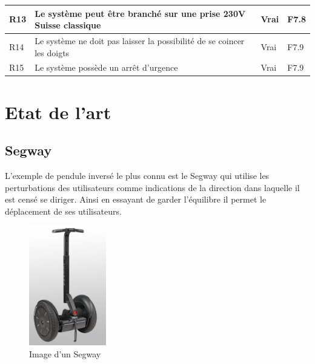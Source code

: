 \begin{table}[H]
{\begin{tabular}{|l|l|l|l|}
            R13                                                                                                                     & Le système peut être branché sur une prise 230V Suisse classique        & Vrai             & F7.8     \\ \hline
            R14                                                                                                                     & Le système ne doit pas laisser la possibilité de se coincer les doigts  & Vrai             & F7.9     \\ \hline
            R15                                                                                                                     & Le système possède un arrêt d'urgence                                   & Vrai             & F7.9     \\ \hline
        \end{tabular}%
    }
\end{table}

\section{Etat de l'art}\label{sec:EtatArt}

\subsection{Segway}

L'exemple de pendule inversé le plus connu est le Segway \cite{Segway} qui utilise les perturbations des utilisateurs comme indications de la direction dans laquelle il est censé se diriger. Ainsi en essayant de garder l'équilibre il permet le déplacement de ses utilisateurs.

\begin{figure}[H]
    \centering
    \includegraphics[width = 0.3\textwidth]{assets/figures/Segway.png}
    \caption{Image d'un Segway \cite{Segway}}
    \label{fig:Segway}
\end{figure}

